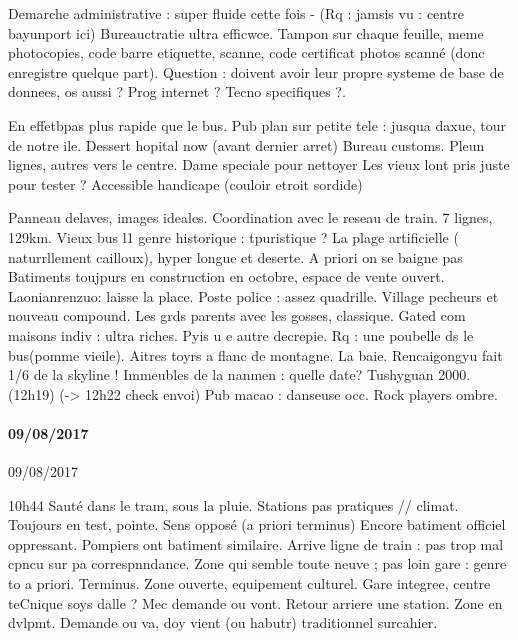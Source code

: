Demarche administrative : super fluide cette fois -
(Rq : jamsis vu : centre bayunport ici)
Bureauctratie ultra efficwce. Tampon sur chaque feuille, meme photocopies, code barre etiquette, scanne, code certificat photos scanné (donc enregistre quelque part). Question : doivent avoir leur propre systeme de base de donnees, os aussi ? Prog internet ? Tecno specifiques ?.

En effetbpas plus rapide que le bus.
Pub plan sur petite tele : jusqua daxue, tour de notre ile.
Dessert hopital now (avant dernier arret)
Bureau customs.
Pleun lignes, autres vers le centre.
Dame speciale pour nettoyer
Les vieux lont pris juste pour tester ?
Accessible handicape (couloir etroit sordide)

Panneau delaves, images ideales.
Coordination avec le reseau de train.
7 lignes, 129km.
Vieux bus l1 genre historique : tpuristique ?
La plage artificielle ( naturrllement cailloux), hyper longue et deserte. A priori on se baigne pas
Batiments toujpurs en construction en octobre, espace de vente ouvert.
Laonianrenzuo: laisse la place.
Poste police : assez quadrille. Village pecheurs et nouveau compound.
Les grds parents avec les gosses, classique.
Gated com maisons indiv : ultra riches. Pyis u e autre decrepie.
Rq : une poubelle ds le bus(pomme vieile).
Aitres toyrs a flanc de montagne.
La baie. Rencaigongyu fait 1/6 de la skyline !
Immeubles de la nanmen : quelle date? Tushyguan 2000.
(12h19)
(-> 12h22 check envoi)
Pub macao : danseuse occ. Rock players ombre.





\paragraph{09/08/2017}{09/08/2017}

10h44
Sauté dans le tram, sous la pluie.
Stations pas pratiques // climat.
Toujours en test, pointe.
Sens opposé (a priori terminus)
Encore batiment officiel oppressant. Pompiers ont batiment similaire.
Arrive ligne de train : pas trop mal cpncu sur pa correspnndance. Zone qui semble toute neuve ; pas loin gare : genre to a priori. Terminus. Zone ouverte, equipement culturel. Gare integree, centre teCnique soys dalle ? Mec demande ou vont. Retour arriere une station.
Zone en dvlpmt. Demande ou va, doy vient (ou habutr) traditionnel surcahier.

